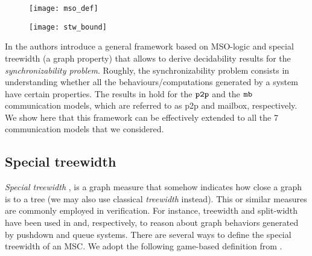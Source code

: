 
\begin{figure}[ht]
	\begin{center}
	\texttt{[image: mso\_def]}
	\end{center}
\end{figure}

\begin{figure}[ht]
	\begin{center}
	\texttt{[image: stw\_bound]}
	\end{center}
\end{figure}

In \cite{BolligFG21} the authors introduce a general framework based on MSO-logic and special treewidth (a graph property) that allows to derive decidability results for the \emph{synchronizability problem}. Roughly, the synchronizability problem consists in understanding whether all the behaviours/computations generated by a system have certain properties. The results in \cite{BolligFG21} hold for the $\mathtt{p2p}$ and the $\mathtt{mb}$ communication models, which are referred to as p2p and mailbox, respectively. We show here that this framework can be effectively extended to all the 7 communication models that we considered.

\subsection{Special treewidth}

\emph{Special treewidth} \cite{Courcelle10},
is a graph measure that somehow indicates how close
a graph is to a tree (we may also use classical \emph{treewidth} instead).
This or similar measures are commonly employed in verification. For instance, treewidth and split-width have been used in \cite{MadhusudanP11} and, respectively, \cite{DBLP:conf/concur/CyriacGK12,AiswaryaGK14} to reason about graph behaviors generated by pushdown and queue systems.
There are several ways to define the special treewidth of an MSC.
We adopt the following game-based definition from \cite{DBLP:journals/corr/abs-1904-06942}.

